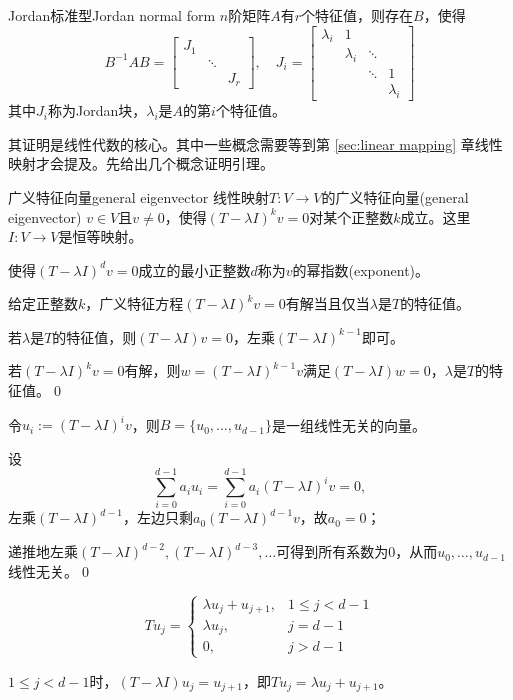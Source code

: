 \begin{theorem}{Jordan标准型}{Jordan normal form}
	$n$阶矩阵$A$有$r$个特征值，则存在$B$，使得
	\[
		B^{-1}AB=\begin{bmatrix}
			J_1             \\
			 & \ddots       \\
			 &        & J_r
		\end{bmatrix},\quad
		J_i=\begin{bmatrix}
			\lambda_i & 1                              \\
			          & \lambda_i & \ddots             \\
			          &           & \ddots & 1         \\
			          &           &        & \lambda_i
		\end{bmatrix}
	\]
	其中$J_i$称为Jordan块，$\lambda_i$是$A$的第$i$个特征值。
\end{theorem}
\prf 其证明是线性代数的核心。其中一些概念需要等到第 \ref{sec:linear mapping} 章线性映射才会提及。先给出几个概念证明引理。
\begin{definition}{广义特征向量}{general eigenvector}
	线性映射$T:V\to V$的广义特征向量(general eigenvector) $v\in V$且$v\neq 0$，使得$(T-\lambda I)^kv=0$对某个正整数$k$成立。这里$I:V\to V$是恒等映射。

	使得$(T-\lambda I)^dv=0$成立的最小正整数$d$称为$v$的幂指数(exponent)。
\end{definition}
\begin{theorem}{}{}
	给定正整数$k$，广义特征方程$(T-\lambda I)^kv=0$有解当且仅当$\lambda$是$T$的特征值。
\end{theorem}
\prf 若$\lambda$是$T$的特征值，则$(T-\lambda I)v=0$，左乘$(T-\lambda I)^{k-1}$即可。

若$(T-\lambda I)^kv=0$有解，则$w=(T-\lambda I)^{k-1}v$满足$(T-\lambda I)w=0$，$\lambda$是$T$的特征值。\qed
\begin{theorem}{}{}
	令$u_i:=(T-\lambda I)^iv$，则$B=\{u_0,\ldots,u_{d-1}\}$是一组线性无关的向量。
\end{theorem}
\prf 设
\[
	\sum_{i=0}^{d-1}a_iu_i=\sum_{i=0}^{d-1}a_i(T-\lambda I)^iv=0,
\]
左乘$(T-\lambda I)^{d-1}$，左边只剩$a_0(T-\lambda I)^{d-1}v$，故$a_0=0$；

递推地左乘$(T-\lambda I)^{d-2},(T-\lambda I)^{d-3},\ldots$可得到所有系数为0，从而$u_0,\ldots,u_{d-1}$线性无关。\qed
\begin{theorem}{}{}
	\[
		Tu_j=\begin{cases}
			\lambda u_j+u_{j+1},&1\leqslant j<d-1\\
			\lambda u_j,&j=d-1\\
			0,&j>d-1
		\end{cases}
	\]
\end{theorem}
\prf $1\leqslant j<d-1$时，$(T-\lambda I)u_j=u_{j+1}$，即$Tu_j=\lambda u_j+u_{j+1}$。

